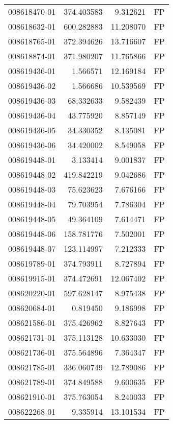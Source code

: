 \begin{tabular}{lrrl}
008618470-01 &  374.403583 &       9.312621 &   FP \\
008618632-01 &  600.282883 &      11.208070 &   FP \\
008618765-01 &  372.394626 &      13.716607 &   FP \\
008618874-01 &  371.980207 &      11.765866 &   FP \\
008619436-01 &    1.566571 &      12.169184 &   FP \\
008619436-02 &    1.566686 &      10.539569 &   FP \\
008619436-03 &   68.332633 &       9.582439 &   FP \\
008619436-04 &   43.775920 &       8.857149 &   FP \\
008619436-05 &   34.330352 &       8.135081 &   FP \\
008619436-06 &   34.420002 &       8.549058 &   FP \\
008619448-01 &    3.133414 &       9.001837 &   FP \\
008619448-02 &  419.842219 &       9.042686 &   FP \\
008619448-03 &   75.623623 &       7.676166 &   FP \\
008619448-04 &   79.703954 &       7.786304 &   FP \\
008619448-05 &   49.364109 &       7.614471 &   FP \\
008619448-06 &  158.781776 &       7.502001 &   FP \\
008619448-07 &  123.114997 &       7.212333 &   FP \\
008619789-01 &  374.793911 &       8.727894 &   FP \\
008619915-01 &  374.472691 &      12.067402 &   FP \\
008620220-01 &  597.628147 &       8.975438 &   FP \\
008620684-01 &    0.819450 &       9.186998 &   FP \\
008621586-01 &  375.426962 &       8.827643 &   FP \\
008621731-01 &  375.113128 &      10.633030 &   FP \\
008621736-01 &  375.564896 &       7.364347 &   FP \\
008621785-01 &  336.060749 &      12.789086 &   FP \\
008621789-01 &  374.849588 &       9.600635 &   FP \\
008621910-01 &  375.763054 &       8.240033 &   FP \\
008622268-01 &    9.335914 &      13.101534 &   FP \\

\end{tabular}
